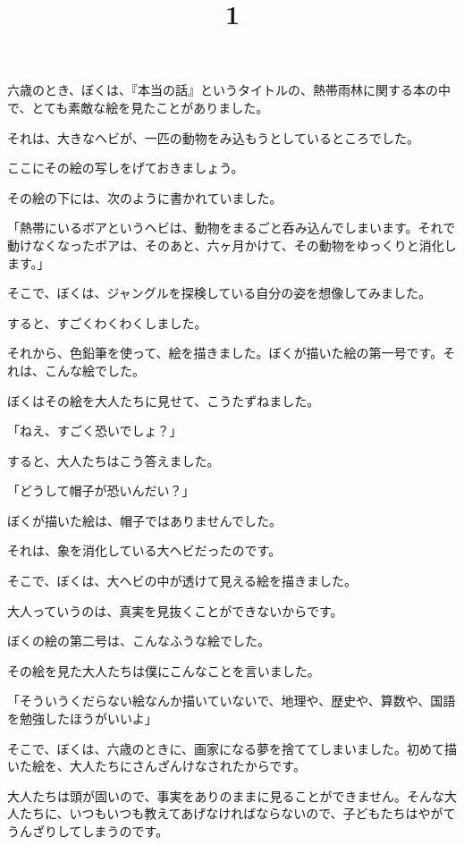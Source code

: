 
\title{1}

六歳のとき、ぼくは、『本当の話』というタイトルの、熱帯雨林に関する本の中で、とても素敵な絵を見たことがありました。

それは、大きなヘビが、一匹の動物をみ込もうとしているところでした。

ここにその絵の写しをげておきましょう。

その絵の下には、次のように書かれていました。

「熱帯にいるボアというヘビは、動物をまるごと呑み込んでしまいます。それで動けなくなったボアは、そのあと、六ヶ月かけて、その動物をゆっくりと消化します。」


そこで、ぼくは、ジャングルを探検している自分の姿を想像してみました。

すると、すごくわくわくしました。

それから、色鉛筆を使って、絵を描きました。ぼくが描いた絵の第一号です。それは、こんな絵でした。

ぼくはその絵を大人たちに見せて、こうたずねました。

「ねえ、すごく恐いでしょ？」

すると、大人たちはこう答えました。

「どうして帽子が恐いんだい？」

ぼくが描いた絵は、帽子ではありませんでした。


それは、象を消化している大ヘビだったのです。

そこで、ぼくは、大ヘビの中が透けて見える絵を描きました。

大人っていうのは、真実を見抜くことができないからです。

ぼくの絵の第二号は、こんなふうな絵でした。

その絵を見た大人たちは僕にこんなことを言いました。


「そういうくだらない絵なんか描いていないで、地理や、歴史や、算数や、国語を勉強したほうがいいよ」

そこで、ぼくは、六歳のときに、画家になる夢を捨ててしまいました。初めて描いた絵を、大人たちにさんざんけなされたからです。

大人たちは頭が固いので、事実をありのままに見ることができません。そんな大人たちに、いつもいつも教えてあげなければならないので、子どもたちはやがてうんざりしてしまうのです。

